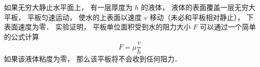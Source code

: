 
如果无穷大静止水平面上， 有一层厚度为 $h$ 的液体， 液体的表面覆盖一层无穷大平板， 平板匀速运动， 使水的上表面以速度 $v$ 移动（未必和平板相对静止）， 下表面速度为零． 实验证明， 平板单位面积受到水的阻力大小 $F$ 可以通过一个简单的公式计算
\begin{equation}
F = \mu \frac{v}{h}
\end{equation}
如果该液体粘度为零， 那么该平板将不会收到任何阻力．
